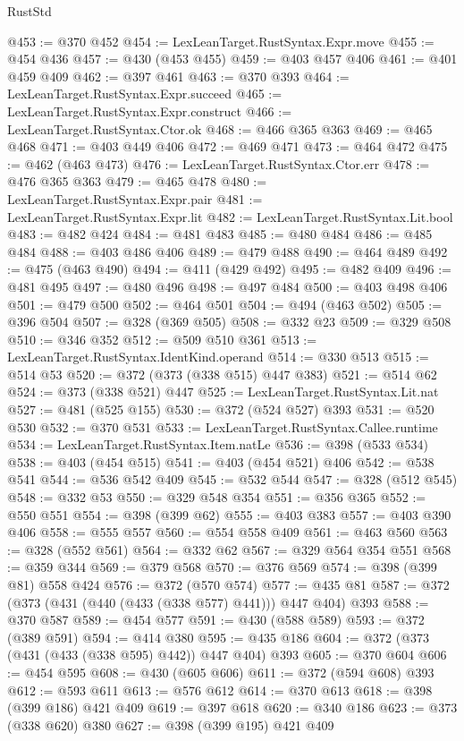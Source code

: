 \begin{lexlean}{RustStd}
\begin{coremodule}
@453 := @370 @452
@454 := LexLeanTarget.RustSyntax.Expr.move
@455 := @454 @436
@457 := @430 (@453 @455)
@459 := @403 @457 @406
@461 := @401 @459 @409
@462 := @397 @461
@463 := @370 @393
@464 := LexLeanTarget.RustSyntax.Expr.succeed
@465 := LexLeanTarget.RustSyntax.Expr.construct
@466 := LexLeanTarget.RustSyntax.Ctor.ok
@468 := @466 @365 @363
@469 := @465 @468
@471 := @403 @449 @406
@472 := @469 @471
@473 := @464 @472
@475 := @462 (@463 @473)
@476 := LexLeanTarget.RustSyntax.Ctor.err
@478 := @476 @365 @363
@479 := @465 @478
@480 := LexLeanTarget.RustSyntax.Expr.pair
@481 := LexLeanTarget.RustSyntax.Expr.lit
@482 := LexLeanTarget.RustSyntax.Lit.bool
@483 := @482 @424
@484 := @481 @483
@485 := @480 @484
@486 := @485 @484
@488 := @403 @486 @406
@489 := @479 @488
@490 := @464 @489
@492 := @475 (@463 @490)
@494 := @411 (@429 @492)
@495 := @482 @409
@496 := @481 @495
@497 := @480 @496
@498 := @497 @484
@500 := @403 @498 @406
@501 := @479 @500
@502 := @464 @501
@504 := @494 (@463 @502)
@505 := @396 @504
@507 := @328 (@369 @505)
@508 := @332 @23
@509 := @329 @508
@510 := @346 @352
@512 := @509 @510 @361
@513 := LexLeanTarget.RustSyntax.IdentKind.operand
@514 := @330 @513
@515 := @514 @53
@520 := @372 (@373 (@338 @515) @447 @383)
@521 := @514 @62
@524 := @373 (@338 @521) @447
@525 := LexLeanTarget.RustSyntax.Lit.nat
@527 := @481 (@525 @155)
@530 := @372 (@524 @527) @393
@531 := @520 @530
@532 := @370 @531
@533 := LexLeanTarget.RustSyntax.Callee.runtime
@534 := LexLeanTarget.RustSyntax.Item.natLe
@536 := @398 (@533 @534)
@538 := @403 (@454 @515)
@541 := @403 (@454 @521) @406
@542 := @538 @541
@544 := @536 @542 @409
@545 := @532 @544
@547 := @328 (@512 @545)
@548 := @332 @53
@550 := @329 @548 @354
@551 := @356 @365
@552 := @550 @551
@554 := @398 (@399 @62)
@555 := @403 @383
@557 := @403 @390 @406
@558 := @555 @557
@560 := @554 @558 @409
@561 := @463 @560
@563 := @328 (@552 @561)
@564 := @332 @62
@567 := @329 @564 @354 @551
@568 := @359 @344
@569 := @379 @568
@570 := @376 @569
@574 := @398 (@399 @81) @558 @424
@576 := @372 (@570 @574)
@577 := @435 @81
@587 := @372 (@373 (@431 (@440 (@433 (@338 @577) @441))) @447 @404) @393
@588 := @370 @587
@589 := @454 @577
@591 := @430 (@588 @589)
@593 := @372 (@389 @591)
@594 := @414 @380
@595 := @435 @186
@604 := @372 (@373 (@431 (@433 (@338 @595) @442)) @447 @404) @393
@605 := @370 @604
@606 := @454 @595
@608 := @430 (@605 @606)
@611 := @372 (@594 @608) @393
@612 := @593 @611
@613 := @576 @612
@614 := @370 @613
@618 := @398 (@399 @186) @421 @409
@619 := @397 @618
@620 := @340 @186
@623 := @373 (@338 @620) @380
@627 := @398 (@399 @195) @421 @409

\end{coremodule}
\end{lexlean}
